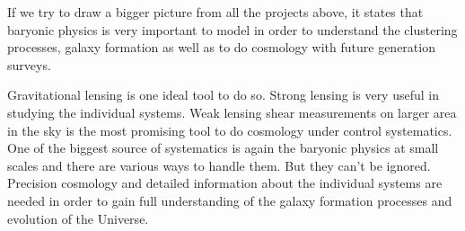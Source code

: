 If we try to draw a bigger picture from all the projects above, it states that
baryonic physics is very important to model in order to understand the clustering processes,
galaxy formation as well as to do cosmology with future generation surveys. 

Gravitational lensing is one ideal tool to do so. Strong lensing
is very useful in studying the individual systems. 
Weak lensing shear measurements
on larger area in the sky is the most promising tool to do cosmology under
control systematics. One of the biggest source of systematics is again the 
baryonic physics at small scales and there are various ways to handle them. But
they can't be ignored. Precision cosmology and detailed information about the 
individual systems are needed in order to gain full understanding of the 
galaxy formation processes and evolution of the Universe. 







\clearpage
\cite{2014MNRAS.440.2290M}

\cite{2014MNRAS.439.2651M}

\cite{2014A&A...567A..65B}

\cite{2014MNRAS.445.3382M}

\cite{2014arXiv1410.6826M}

\cite{2015PASJ...67...21M}

\cite{2015arXiv150403388M}






